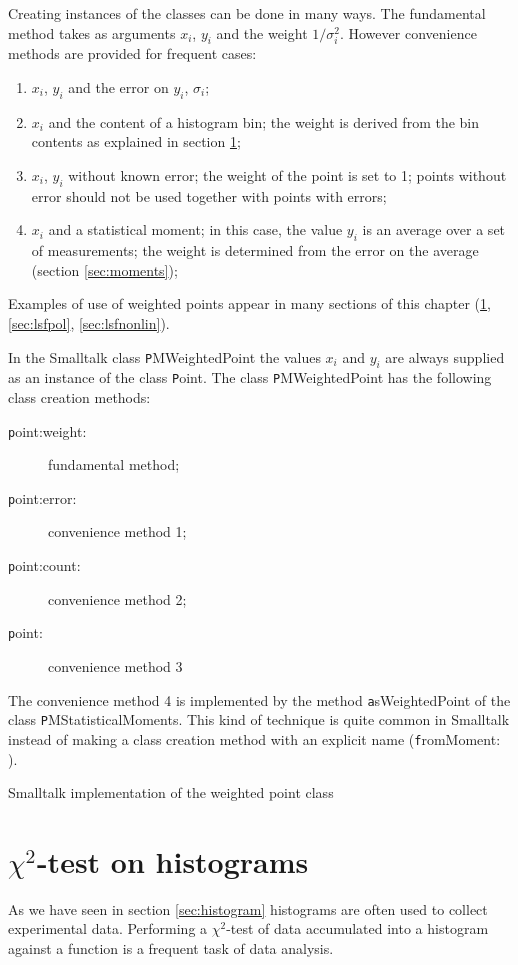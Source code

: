 Creating instances of the classes can be done in many ways. The
fundamental method takes as arguments $x_i$, $y_i$ and the weight
$1/\sigma_i^2$. However convenience methods are provided for
frequent cases:
\begin{enumerate}
  \item $x_i$, $y_i$ and the error on $y_i$, $\sigma_i$;
  \item $x_i$ and the content of a histogram bin; the weight is derived
  from the bin contents as explained in section \ref{sec:chitesthist};
  \item $x_i$, $y_i$ without known error; the weight of the point is set to
  1; points without error should not be used together with points
  with errors;
  \item $x_i$ and a statistical moment; in this case, the value $y_i$
  is an average over a set of measurements; the weight is determined
  from the error on the average (\cf section \ref{sec:moments});
\end{enumerate}
Examples of use of weighted points appear in many sections of this
chapter (\ref{sec:chitesthist}, \ref{sec:lsfpol},
\ref{sec:lsfnonlin}).

In the Smalltalk class {\texttt PMWeightedPoint} the values $x_i$ and
$y_i$ are always supplied as an instance of the class {\texttt Point}.
The class {\texttt PMWeightedPoint} has the following class creation
methods:
\begin{description}
  \item[\texttt point:weight:] fundamental method;
  \item[\texttt point:error:] convenience method 1;
  \item[\texttt point:count:] convenience method 2;
  \item[\texttt point:] convenience method 3
\end{description}
The convenience method 4 is implemented by the method {\texttt
asWeightedPoint} of the class {\texttt PMStatisticalMoments}. This
kind of technique is quite common in Smalltalk instead of making a
class creation method with an explicit name ({\texttt fromMoment:}
\eg).

\begin{listing} Smalltalk implementation of the weighted point class
\label{ls:weightedPoint}


\end{listing}

\section{$\chi^2$-test on histograms}
\label{sec:chitesthist} As we have seen in section
\ref{sec:histogram} histograms are often used to collect
experimental data. Performing a $\chi^2$-test of data accumulated
into a histogram against a function is a frequent task of data
analysis.

